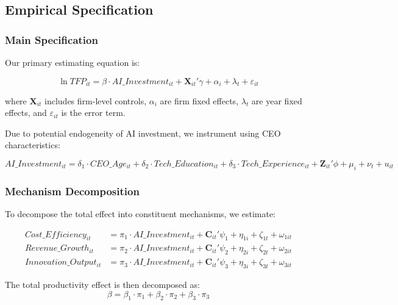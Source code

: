 \documentclass[12pt, a4paper]{article}
\begin{document}
\subsection{Empirical Specification}

\subsubsection{Main Specification}

Our primary estimating equation is:

\begin{equation}
\ln TFP_{it} = \beta \cdot AI\_Investment_{it} + \mathbf{X}_{it}'\gamma + \alpha_i + \lambda_t + \varepsilon_{it}
\end{equation}

where $\mathbf{X}_{it}$ includes firm-level controls, $\alpha_i$ are firm fixed effects, $\lambda_t$ are year fixed effects, and $\varepsilon_{it}$ is the error term.

Due to potential endogeneity of AI investment, we instrument using CEO characteristics:

\begin{equation}
AI\_Investment_{it} = \delta_1 \cdot CEO\_Age_{it} + \delta_2 \cdot Tech\_Education_{it} + \delta_3 \cdot Tech\_Experience_{it} + \mathbf{Z}_{it}'\phi + \mu_i + \nu_t + u_{it}
\end{equation}

\subsubsection{Mechanism Decomposition}

To decompose the total effect into constituent mechanisms, we estimate:

\begin{align}
Cost\_Efficiency_{it} &= \pi_1 \cdot AI\_Investment_{it} + \mathbf{C}_{it}'\psi_1 + \eta_{1i} + \zeta_{1t} + \omega_{1it} \\
Revenue\_Growth_{it} &= \pi_2 \cdot AI\_Investment_{it} + \mathbf{C}_{it}'\psi_2 + \eta_{2i} + \zeta_{2t} + \omega_{2it} \\
Innovation\_Output_{it} &= \pi_3 \cdot AI\_Investment_{it} + \mathbf{C}_{it}'\psi_3 + \eta_{3i} + \zeta_{3t} + \omega_{3it}
\end{align}

The total productivity effect is then decomposed as:
\begin{equation}
\beta = \beta_1 \cdot \pi_1 + \beta_2 \cdot \pi_2 + \beta_3 \cdot \pi_3
\end{equation}
\end{document}

